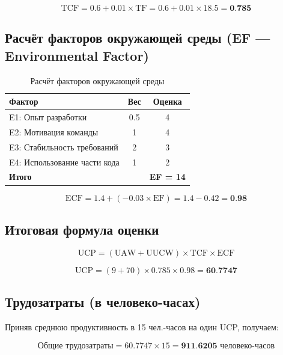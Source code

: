 \documentclass[14pt, russian]{matmex-diploma-custom}
\begin{document}
\begin{equation}
\text{TCF} = 0.6 + 0.01 \times \text{TF} = 0.6 + 0.01 \times 18.5 = \textbf{0.785}
\end{equation}


\subsection{Расчёт факторов окружающей среды (EF — Environmental Factor)}

\begin{table}[H]
\centering
\begin{tabular}{|p{6.5cm}|c|c|}
\hline
Фактор & Вес & Оценка \\
\hline
E1: Опыт разработки & 0.5 & 4 \\
E2: Мотивация команды & 1 & 4 \\
E3: Стабильность требований & 2 & 3 \\
E4: Использование части кода & 1 & 2 \\
\hline
\textbf{Итого} & & \textbf{EF = 14} \\
\hline
\end{tabular}
\caption{Расчёт факторов окружающей среды}
\end{table}

\begin{equation}
    \text{ECF} = 1.4 + (-0.03 \times \text{EF}) = 1.4 - 0.42 = \textbf{0.98}
\end{equation}

\subsection{Итоговая формула оценки}

\begin{equation}
    \text{UCP} = (\text{UAW} + \text{UUCW}) \times \text{TCF} \times \text{ECF}
\end{equation}

\begin{equation}
    \text{UCP} = (9 + 70) \times 0.785 \times 0.98 = \textbf{60.7747}
\end{equation}

\subsection{Трудозатраты (в человеко-часах)}

Приняв среднюю продуктивность в 15 чел.-часов на один UCP, получаем:

\begin{equation}
    \text{Общие трудозатраты} = 60.7747 \times 15 = \textbf{911.6205 человеко-часов}
\end{equation}
\end{document}
